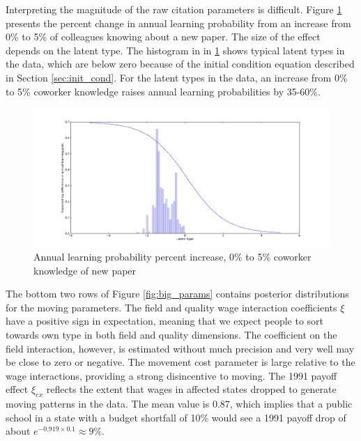 Interpreting the magnitude of the raw citation parameters is difficult.
Figure \ref{fig:learn_probs} presents the percent change in annual learning probability
from an increase from 0\% to 5\% of colleagues knowing about a new paper.
The size of the effect depends on the latent type.  The histogram in in \ref{fig:learn_probs} shows typical latent types
in the data, which are below zero because of the initial condition equation described in Section \ref{sec:init_cond}.  For
the latent types in the data, an increase from 0\% to 5\% coworker knowledge raises annual learning probabilities by 35-60\%.

\begin{figure}[!ht]
    \centering
    \includegraphics[scale=0.35]{pics/learn_probs.png}
    \caption{Annual learning probability percent increase, 0\% to 5\% coworker knowledge of new paper}
    \label{fig:learn_probs}
\end{figure}

The bottom two rows of Figure \ref{fig:big_params} contains posterior distributions for the
moving parameters. The field and quality wage
interaction coefficients $\xi$ have a positive sign in expectation, meaning
that we expect people to sort towards own type in both field and quality dimensions. The coefficient on the 
field interaction, 
however, is estimated without much precision and very well may be close
to zero or negative. The movement cost parameter is large relative to the wage interactions, providing a strong 
disincentive to moving.  The 1991 payoff effect $\xi_{ex}$ reflects the extent that
wages in affected states dropped to generate moving patterns in the
data. The mean value is
0.87, which implies that a public school in a state with a budget
shortfall of 10\% would see a 1991 payoff drop of about
$e^{-0.919 \times 0.1} \approx 9\%$.\footnotemark{}

